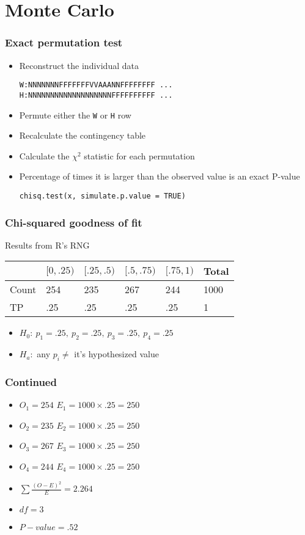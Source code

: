 \documentclass[aspectratio=169]{beamer}
\begin{document}
\section{Monte Carlo}
\begin{frame}[fragile]\frametitle{Exact permutation test}
\begin{itemize}
\item Reconstruct the individual data
\begin{verbatim}
W:NNNNNNNFFFFFFFVVAAANNFFFFFFFF ... 
H:NNNNNNNNNNNNNNNNNNNFFFFFFFFFF ...
\end{verbatim}
\item Permute either the \texttt{W} or \texttt{H} row
\item Recalculate the contingency table
\item Calculate the $\chi^2$ statistic for each permutation
\item Percentage of times it is larger than the observed value is an
  exact P-value
\begin{verbatim}
chisq.test(x, simulate.p.value = TRUE)
\end{verbatim}
\end{itemize}
\end{frame}

\begin{frame}[fragile]\frametitle{Chi-squared goodness of fit}
Results from R's RNG 
\begin{center}
\ttfamily
\begin{tabular}{llllll}
      & $[0,.25)$ & $[.25, .5)$ & $[.5, .75)$ & $[.75, 1)$ & Total \\ \hline
Count & 254 & 235 & 267 & 244 & 1000 \\
TP    & .25 & .25 & .25 & .25 & 1 \\ \hline
\end{tabular}
\normalfont
\end{center}
\begin{itemize}
\item $H_0:~p_1 = .25,~p_2 = .25,~ p_3 = .25,~ p_4 = .25$
\item $H_a:$ any $p_i \neq$ it's hypothesized value 
\end{itemize}
\end{frame}

\begin{frame}\frametitle{Continued}
\begin{itemize}
\item $O_1 = 254$ $E_1 = 1000 \times .25 = 250$
\item $O_2 = 235$ $E_2 = 1000 \times .25 = 250$
\item $O_3 = 267$ $E_3 = 1000 \times .25 = 250$
\item $O_4 = 244$ $E_4 = 1000 \times .25 = 250$
\item $\sum \frac{(O - E)^2}{E} = 2.264$
\item $df = 3$
\item $P-value = .52$
\end{itemize}
\end{frame}
\end{document}
